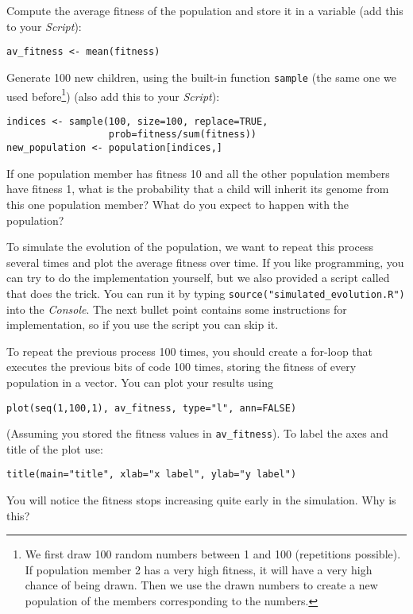 \documentclass[a4paper, 9pt]{article}
\begin{document}
\begin{exercise}
    \action Compute the average fitness of the population and store it in a variable (add this to your \emph{Script}):
\begin{lstlisting}
av_fitness <- mean(fitness)
\end{lstlisting}
    \action Generate 100 new children, using the built-in function \texttt{sample} (the same one we used before\footnote{We first draw 100 random numbers between 1 and 100 (repetitions possible). If population member 2 has a very high fitness, it will have a very high chance of being drawn. Then we use the drawn numbers to create a new population of the members corresponding to the numbers.}) (also add this to your \emph{Script}):
\begin{lstlisting}
indices <- sample(100, size=100, replace=TRUE, 
                  prob=fitness/sum(fitness))
new_population <- population[indices,]
\end{lstlisting}
    \askstar If one population member has fitness 10 and all the other population members have fitness 1, what is the probability that a child will inherit its genome from this one population member? What do you expect to happen with the population?
\end{exercise}
\begin{exercise}
    \action To simulate the evolution of the population, we want to repeat this process several times and plot the average fitness over time. If you like programming, you can try to do the implementation yourself, but we also provided a script called  that does the trick. You can run it by typing \verb|source("simulated_evolution.R")| into the \emph{Console}. The next bullet point contains some instructions for implementation, so if you use the script you can skip it.

    \action To repeat the previous process 100 times, you should create a for-loop that executes the previous bits of code 100 times, storing the fitness of every population in a vector. You can plot your results using
\begin{lstlisting}
plot(seq(1,100,1), av_fitness, type="l", ann=FALSE)
\end{lstlisting}
    (Assuming you stored the fitness values in \texttt{av\_fitness}).
    To label the axes and title of the plot use:
\begin{lstlisting}
title(main="title", xlab="x label", ylab="y label")
\end{lstlisting}
    \askstar You will notice the fitness stops increasing quite early in the simulation. Why is this?
\end{exercise}
\end{document}
